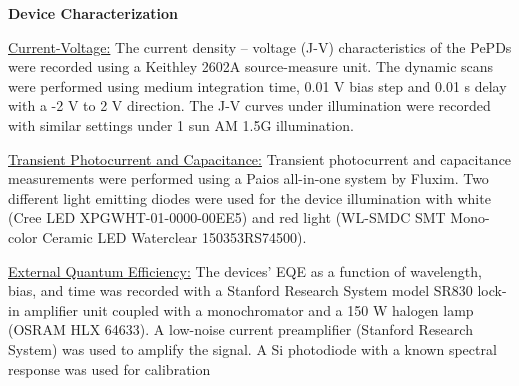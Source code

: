 \textbf{Device Characterization}

\underline{Current-Voltage:} The current density – voltage (J-V) characteristics of the PePDs were recorded using a Keithley 2602A source-measure unit. The dynamic scans were performed using medium integration time, 0.01 V bias step and 0.01 s delay with a -2 V to 2 V direction. The J-V curves under illumination were recorded with similar settings under 1 sun AM 1.5G illumination. 

\underline{Transient Photocurrent and Capacitance:} Transient photocurrent and capacitance measurements were performed using a Paios all-in-one system by Fluxim. Two different light emitting diodes were used for the device illumination with white (Cree LED XPGWHT-01-0000-00EE5) and red light (WL-SMDC SMT Mono-color Ceramic LED Waterclear 150353RS74500).

\underline{External Quantum Efficiency:} The devices' EQE as a function of wavelength, bias, and time was recorded with a Stanford Research System model SR830 lock-in amplifier unit coupled with a monochromator and a 150 W halogen lamp (OSRAM HLX 64633). A low-noise current preamplifier (Stanford Research System) was used to amplify the signal. A Si photodiode with a known spectral response was used for calibration







\cleardoublepage

